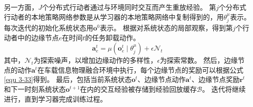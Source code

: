 另一方面，$J$个分布式行动者通过与环境同时交互而产生重放经验。
第$j$个分布式行动者的本地策略网络参数是从学习器的本地策略网络中复制得到的，用$\theta^{\mu}_{j}$表示。
每次迭代的初始化系统状态用$\boldsymbol{o}^{0}$表示。
根据对系统状态的局部观察，得到第$j$个行动者中的边缘节点$e$在时间$t$的任务卸载动作。
\begin{equation}
	\boldsymbol{a}_{e}^{t}={\mu}\left(\boldsymbol{o}_{e}^{t} \mid \theta^{\mu}_{j}\right)+\epsilon  \mathcal{N}_{t}
\end{equation}
\noindent 其中，$\mathcal{N}_{t}$为探索噪声，以增加边缘动作的多样性，$\epsilon$为探索常数。
然后，边缘节点的动作$\boldsymbol{a}^{t}$在车载信息物理融合环境中执行，每个边缘节点的奖励可以根据公式\ref{equ 3-33}得到。
最后，包括当前系统状态$\boldsymbol{o}^{t}$、边缘节点动作$\boldsymbol{a}^{t}$、边缘节点奖励$\boldsymbol{r}^{t}$和下一时刻系统状态$\boldsymbol{o}^{t+1}$在内的交互经验被存储到经验回放缓存$\mathcal{B}$。
迭代将继续进行，直到学习器完成训练过程。

